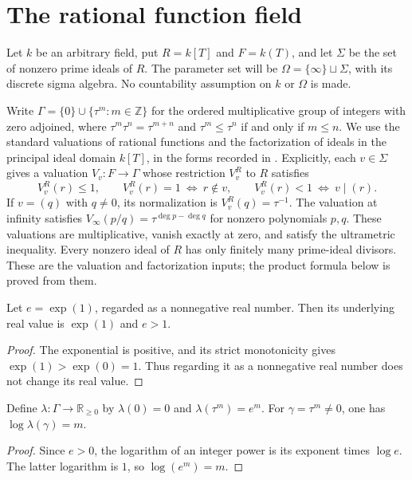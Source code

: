 \section{The rational function field}

Let $k$ be an arbitrary field, put $R=k[T]$ and $F=k(T)$, and let
$\Sigma$ be the set of nonzero prime ideals of $R$. The parameter set
will be $\Omega=\{\infty\}\sqcup\Sigma$, with its discrete sigma algebra.
No countability assumption on $k$ or $\Omega$ is made.

Write $\Gamma=\{0\}\cup\{\tau^m:m\in\mathbb Z\}$ for the ordered
multiplicative group of integers with zero adjoined, where
$\tau^m\tau^n=\tau^{m+n}$ and $\tau^m\leq\tau^n$ if and only if
$m\leq n$. We use the standard valuations of rational functions and the
factorization of ideals in the principal ideal domain $k[T]$, in the
forms recorded in \cite{mathlib-rational-function-valuations}.
Explicitly, each $v\in\Sigma$ gives a valuation $V_v:F\to\Gamma$
whose restriction $V_v^R$ to $R$ satisfies
\[
 V_v^R(r)\leq1,\qquad
 V_v^R(r)=1\ \Longleftrightarrow\ r\notin v,\qquad
 V_v^R(r)<1\ \Longleftrightarrow\ v\mid(r).
\]
If $v=(q)$ with $q\ne0$, its normalization is $V_v^R(q)=\tau^{-1}$.
The valuation at infinity satisfies
$V_\infty(p/q)=\tau^{\deg p-\deg q}$ for nonzero polynomials $p,q$.
These valuations are multiplicative, vanish exactly at zero, and satisfy
the ultrametric inequality. Every nonzero ideal of $R$ has only finitely
many prime-ideal divisors. These are the valuation and factorization
inputs; the product formula below is proved from them.

\begin{definition}\label{def:ff-exp-base}
\leanok
{}
Let $e=\exp(1)$, regarded as a nonnegative real number. Then its underlying
real value is $\exp(1)$ and $e>1$.
\end{definition}
\begin{proof}
The exponential is positive, and its strict monotonicity gives
$\exp(1)>\exp(0)=1$. Thus regarding it as a nonnegative real number
does not change its real value.
\end{proof}

\begin{lemma}
\label{lem:ff-log-exponential}
\leanok
{}
Define $\lambda:\Gamma\to\mathbb R_{\geq0}$ by $\lambda(0)=0$ and
$\lambda(\tau^m)=e^m$. For $\gamma=\tau^m\ne0$, one has
$\log\lambda(\gamma)=m$.
\end{lemma}
\begin{proof}
Since $e>0$, the logarithm of an integer power is its exponent times
$\log e$. The latter logarithm is $1$, so $\log(e^m)=m$.
\end{proof}

